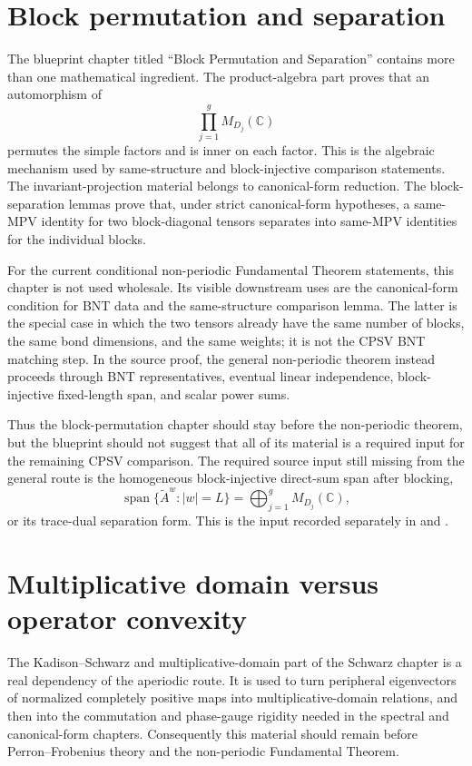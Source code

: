 \documentclass{article}
\begin{document}
\section{Block permutation and separation}

The blueprint chapter titled ``Block Permutation and Separation'' contains more
than one mathematical ingredient. The product-algebra part proves that an
automorphism of
\[
  \prod_{j=1}^g M_{D_j}(\mathbb C)
\]
permutes the simple factors and is inner on each factor. This is the algebraic
mechanism used by same-structure and block-injective comparison statements.
The invariant-projection material belongs to canonical-form reduction. The
block-separation lemmas prove that, under strict canonical-form hypotheses, a
same-MPV identity for two block-diagonal tensors separates into same-MPV
identities for the individual blocks.

For the current conditional non-periodic Fundamental Theorem statements, this
chapter is not used wholesale. Its visible downstream uses are the
canonical-form condition for BNT data and the same-structure comparison lemma.
The latter is the special case in which the two tensors already have the same
number of blocks, the same bond dimensions, and the same weights; it is not the
CPSV BNT matching step. In the source proof, the general non-periodic theorem
instead proceeds through BNT representatives, eventual linear independence,
block-injective fixed-length span, and scalar power sums.

Thus the block-permutation chapter should stay before the non-periodic theorem,
but the blueprint should not suggest that all of its material is a required
input for the remaining CPSV comparison. The required source input still
missing from the general route is the homogeneous block-injective direct-sum
span after blocking,
\[
  \operatorname{span}\{\tilde A^w: |w|=L\}
  = \bigoplus_{j=1}^g M_{D_j}(\mathbb C),
\]
or its trace-dual separation form. This is the input recorded separately in
 and
.

\section{Multiplicative domain versus operator convexity}

The Kadison--Schwarz and multiplicative-domain part of the Schwarz chapter is a
real dependency of the aperiodic route. It is used to turn peripheral
eigenvectors of normalized completely positive maps into multiplicative-domain
relations, and then into the commutation and phase-gauge rigidity needed in the
spectral and canonical-form chapters. Consequently this material should remain
before Perron--Frobenius theory and the non-periodic Fundamental Theorem.
\end{document}

